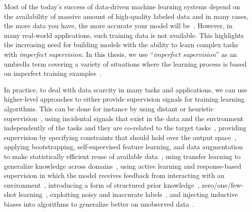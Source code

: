Most of the today's success of data-driven machine learning systems depend on the availability of massive amount of high-quality labeled data and in many cases, the more data you have, the more accurate your model will be~\citep{halevy2009unreasonable,sun2017revisiting}. 
However, in many real-world applications, such training data is not available.
This highlights the increasing need for building models with the ability to learn complex tasks with \emph{imperfect supervision}. In this thesis, we use ``\emph{imperfect supervision}'' as an umbrella term covering a variety of situations where the learning process is based on imperfect training examples~\citep{zhou2018brief}.

In practice, to deal with data scarcity in many tasks and applications, we can use higher-level approaches to either provide supervision signals for training learning algorithms. 
This can be done for instance by
using distant or heuristic supervision~\citep{Deriu2016:SemEval,Severyn:2015:SemEval, Dehghani:2016:SIGIR, dehghani:2018:ICLR, Dehghani:2017:nips_metalearn, Ratner:2016,Rekatsinas:2017,Varma:2017}, 
%
using incidental signals that exist in the data and the environment independently of the tasks and they are co-related to the target tasks~\citep{roth2017incidental}, 
%
providing supervision by specifying constraints that should hold over the output space~\citep{stewart2017label, clarke2010driving}, 
%
applying bootstrapping, self-supervised feature learning, and data augmentation to make statistically efficient reuse of available data~\citep{cubuk2018autoaugment, dosovitskiy2016discriminative,donahue2016adversarial},
%
using transfer learning to generalize knowledge across domains~\citep{Ruder:2019},
%
using active learning and response-based supervision in which the model receives feedback from interacting with an environment~\citep{clarke2010driving,riezler2014response},
%
introducing a form of structured prior knowledge~\citep{Dehghani:CIKM2016:long,Dehghani:2016:ICTIR}, 
%
zero/one/few-shot learning~\citep{vinyals2016matching,finn2017model,snell2017prototypical,socher2013zero},
%
exploiting noisy and inaccurate labels~\citep{Vahdat:2017, Lee:2013,Hinton:2015,Brodley:1999,reed2014training, Patrini:2016, patrini2016loss,malach2017decoupling}, 
%
and injecting inductive biases into algorithms to generalize better on unobserved data~\citep{cohen2016group, cohen2016steerable, Dehghani:ICLR:2019}.

